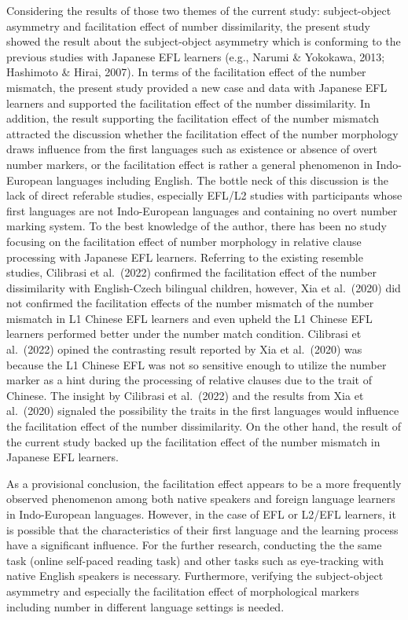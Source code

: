 \documentclass[
]{article}
\begin{document}
Considering the results of those two themes of the current study:
subject-object asymmetry and facilitation effect of number
dissimilarity, the present study showed the result about the
subject-object asymmetry which is conforming to the previous studies
with Japanese EFL learners (e.g., Narumi \& Yokokawa, 2013; Hashimoto \&
Hirai, 2007). In terms of the facilitation effect of the number
mismatch, the present study provided a new case and data with Japanese
EFL learners and supported the facilitation effect of the number
dissimilarity. In addition, the result supporting the facilitation
effect of the number mismatch attracted the discussion whether the
facilitation effect of the number morphology draws influence from the
first languages such as existence or absence of overt number markers, or
the facilitation effect is rather a general phenomenon in Indo-European
languages including English. The bottle neck of this discussion is the
lack of direct referable studies, especially EFL/L2 studies with
participants whose first languages are not Indo-European languages and
containing no overt number marking system. To the best knowledge of the
author, there has been no study focusing on the facilitation effect of
number morphology in relative clause processing with Japanese EFL
learners. Referring to the existing resemble studies, Cilibrasi et
al.~(2022) confirmed the facilitation effect of the number dissimilarity
with English-Czech bilingual children, however, Xia et al.~(2020) did
not confirmed the facilitation effects of the number mismatch of the
number mismatch in L1 Chinese EFL learners and even upheld the L1
Chinese EFL learners performed better under the number match condition.
Cilibrasi et al.~(2022) opined the contrasting result reported by Xia et
al.~(2020) was because the L1 Chinese EFL was not so sensitive enough to
utilize the number marker as a hint during the processing of relative
clauses due to the trait of Chinese. The insight by Cilibrasi et
al.~(2022) and the results from Xia et al.~(2020) signaled the
possibility the traits in the first languages would influence the
facilitation effect of the number dissimilarity. On the other hand, the
result of the current study backed up the facilitation effect of the
number mismatch in Japanese EFL learners.

As a provisional conclusion, the facilitation effect appears to be a
more frequently observed phenomenon among both native speakers and
foreign language learners in Indo-European languages. However, in the
case of EFL or L2/EFL learners, it is possible that the characteristics
of their first language and the learning process have a significant
influence. For the further research, conducting the the same task
(online self-paced reading task) and other tasks such as eye-tracking
with native English speakers is necessary. Furthermore, verifying the
subject-object asymmetry and especially the facilitation effect of
morphological markers including number in different language settings is
needed.
\end{document}
